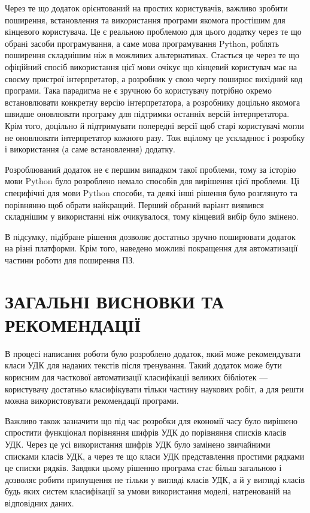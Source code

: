 \documentclass[14pt]{extarticle}
\let\oldsection\section
\renewcommand{\section}{\clearpage\oldsection}
\newcommand{\unnumberedSection}[1]{%
  \section*{#1}%
  \phantomsection
  \addcontentsline{toc}{section}{#1}%
}
\begin{document}
  Через те що додаток орієнтований на простих користувачів,
  важливо зробити поширення,
  встановлення та використання програми якомога простішим
  для кінцевого користувача. Це є реальною проблемою для цього додатку
  через те що обрані засоби програмування, а саме мова програмування Python,
  роблять поширення складнішим ніж в можливих альтернативах.
  Стається це через те що офіційний спосіб використання цієї мови
  очікує що кінцевий користувач має на своєму пристрої інтерпретатор,
  а розробник у свою чергу поширює вихідний код програми.
  Така парадигма не є зручною бо користувачу потрібно
  окремо встановлювати конкретну версію інтерпретатора,
  а розробнику доцільно якомога швидше оновлювати програму
  для підтримки останніх версій інтерпретатора. Крім того,
  доцільно й підтримувати попередні версії щоб старі користувачі
  могли не оновлювати інтерпретатор кожного разу.
  Тож вцілому це ускладнює і розробку і використання (а саме встановлення)
  додатку.

  Розроблюваний додаток не є першим випадком такої проблеми,
  тому за історію мови Python було розроблено немало способів для вирішення
  цієї проблеми. Ці специфічні для мови Python способи,
  та деякі інші рішення було розглянуто та порівнянно щоб обрати найкращий.
  Перший обраний варіант виявився складнішим у використанні ніж очикувалося,
  тому кінцевий вибір було змінено.

  В підсумку, підібране рішення дозволяє достатньо зручно поширювати
  додаток на різні платформи. Крім того,
  наведено можливі покращення для автоматизації частини роботи для поширення ПЗ.

  \unnumberedSection{ЗАГАЛЬНІ ВИСНОВКИ ТА РЕКОМЕНДАЦІЇ}
  В процесі написання роботи було розроблено додаток,
  який може рекомендувати класи УДК для наданих текстів після тренування.
  Такий додаток може бути корисним для часткової автоматизації
  класифікації великих бібліотек ---
  користувачу достатньо класифікувати тільки частину наукових робіт,
  а для решти можна використовувати рекомендації програми.

  Важливо також зазначити що під час розробки для економії часу було вирішено
  спростити функціонал порівняння шифрів УДК до порівняння списків класів УДК.
  Через це усі використання шифрів УДК було замінено звичайними
  списками класів УДК, а через те що класи УДК представлення простими рядками
  це списки рядків.
  Завдяки цьому рішенню програма стає більш загальною і дозволяє робити
  припущення не тільки у вигляді класів УДК, а й у вигляді класів
  будь яких систем класифікації за умови використання моделі,
  натренованій на відповідних даних.
\end{document}
